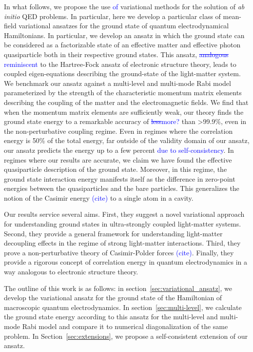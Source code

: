 \documentclass[aps,prb,twocolumn,
	groupedaddress,superscriptaddress,
	amsfonts,amssymb,amsmath,floatfix,
	citeautoscript]{revtex4-1}
\newcommand{\Jadd}[1]{\textcolor{blue}{#1}}
\newcommand{\Jrem}[1]{\textcolor{blue}{\sout{#1}}}
\begin{document}
In what follows, we propose the use \Jadd{of} variational methods for the solution of \emph{ab initio} QED problems. In particular, here we develop a particular class of mean-field variational ansatzes for the ground state of quantum electrodynamical Hamiltonians. In particular, we develop an ansatz in which the ground state can be considered as a factorizable state of an effective matter and effective photon quasiparticle both in their respective ground states. This ansatz, \Jrem{analogous} \Jadd{reminiscent} to the Hartree-Fock ansatz of electronic structure theory, leads to coupled eigen-equations describing the ground-state of the light-matter system. We benchmark our ansatz against a multi-level and multi-mode Rabi model parameterized by the strength of the characteristic momentum matrix elements describing the coupling of the matter and the electromagnetic fields. We find that when the momentum matrix elements are sufficiently weak, our theory finds the ground state energy to a remarkable accuracy of \Jrem{less}\Jadd{more?} than >99.9\%, even in the non-perturbative coupling regime. Even in regimes where the correlation energy is 50\% of the total energy, far outside of the validity domain of our ansatz, our ansatz predicts the energy up to a few percent \Jadd{due to self-consistency}. In regimes where our results are accurate, we claim we have found the effective quasiparticle description of the ground state. Moreover, in this regime, the ground state interaction energy manifests itself as the difference in zero-point energies between the quasiparticles and the bare particles. This generalizes the notion of the Casimir energy \Jadd{(cite)} to a single atom in a cavity.

Our results service several aims. First, they suggest a novel variational approach for understanding ground states in ultra-strongly coupled light-matter systems. Second, they provide a general framework for understanding light-matter decoupling effects in the regime of strong light-matter interactions. Third, they prove a non-perturbative theory of Casimir-Polder forces \Jadd{(cite)}. Finally, they provide a rigorous concept of correlation energy in quantum electrodynamics in a way analogous to electronic structure theory. 

The outline of this work is as follows: in section~\ref{sec:variational_ansatz}, we develop the variational ansatz for the ground state of the Hamiltonian of macroscopic quantum electrodynamics. In section~\ref{sec:multi-level}, we calculate the ground state energy according to this ansatz for the multi-level and multi-mode Rabi model and compare it to numerical diagonalization of the same problem. In Section~\ref{sec:extensions}, we propose a self-consistent extension of our ansatz. 
\end{document}
